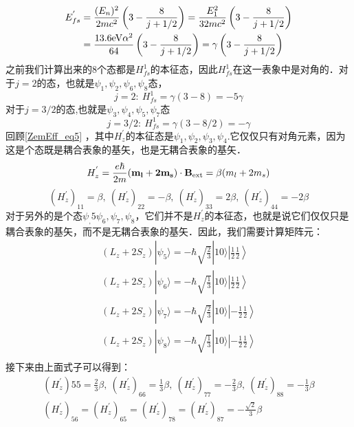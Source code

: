 \begin{align}
E_{fs}^{'}&=\frac{(E_n)^2}{2mc^2}\left(3-\frac{8}{j+1/2}\right)=\frac{E_1^2}{32mc^2}\left(3-\frac{8}{j+1/2}\right)\\
&=\frac{13.6\rm{eV}\alpha^2}{64}\left(3-\frac{8}{j+1/2}\right)=\gamma\left(3-\frac{8}{j+1/2}\right)
\end{align}
之前我们计算出来的$8$个态都是$H_{fs}^1$的本征态，因此$H_{fs}^1$在这一表象中是对角的．对于$j=2$的态，也就是$\psi_1,\psi_2,\psi_6,\psi_8$态，
\begin{equation}
j=2: \ H_{fs}^1=\gamma(3-8)=-5\gamma
\end{equation}
对于$j=3/2$的态,也就是$\psi_3,\psi_4,\psi_5,\psi_7$态
\begin{equation}
j=3/2: \ H_{fs}^1=\gamma(3-8/2)=-\gamma
\end{equation}
回顾\autoref{ZemEff_eq5} ，其中$H_z^{'}$的本征态是$\psi_1,\psi_2,\psi_3,\psi_4$.它仅仅只有对角元素，因为这是个态既是耦合表象的基矢，也是无耦合表象的基矢．
\begin{equation}
H_z^{'} = \frac{e\hbar}{2m}(\mathbf{m_l+2m_s})\cdot \mathbf{B}_{\rm{ext}}=\beta(m_l+2m_s)
\end{equation}
\begin{equation}
(H_z^{'})_{11}=\beta,\ (H_z^{'})_{22}=-\beta,\ (H_z^{'})_{33}=2\beta,\ (H_z^{'})_{44}=-2\beta
\end{equation}
对于另外的是个态$\psi_,5\psi_6,\psi_7,\psi_8$，它们并不是$H_{z}^{'}$的本征态，也就是说它们仅仅只是耦合表象的基矢，而不是无耦合表象的基矢．因此，我们需要计算矩阵元：
\begin{align}
(L_z+2S_z)|\psi_5\rangle= -\hbar\sqrt{\frac{2}{3}}|10\rangle\left|\frac{1}{2}\frac{1}{2}\right\rangle\\
(L_z+2S_z)|\psi_6\rangle=-\hbar\sqrt{\frac{1}{3}}|10\rangle\left|\frac{1}{2}\frac{1}{2}\right\rangle \\
(L_z+2S_z)|\psi_7\rangle=-\hbar\sqrt{\frac{2}{3}}|10\rangle\left|-\frac{1}{2}\frac{1}{2}\right\rangle \\
(L_z+2S_z)|\psi_8\rangle= -\hbar\sqrt{\frac{1}{3}}|10\rangle\left|-\frac{1}{2}\frac{1}{2}\right\rangle\\
\end{align}
接下来由上面式子可以得到：
\begin{align}
(H_z^{'}){55}=\frac{2}{3}\beta,\ (H_z^{'})_{66}=\frac{1}{3}\beta,\ (H_z^{'})_{77}=-\frac{2}{3}\beta,\ (H_z^{'})_{88}=-\frac{1}{3}\beta\\
(H_z^{'})_{56}=(H_z^{'})_{65}=(H_z^{'})_{78}=(H_z^{'})_{87}=-\frac{\sqrt{2}}{3}\beta
\end{align}
